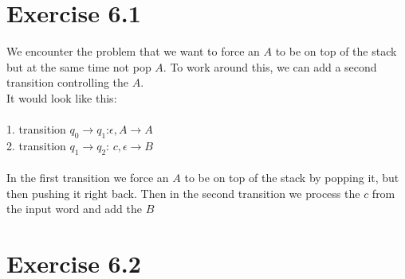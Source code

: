 \documentclass{article} %
\newcommand{\homeworkNumber}{6}
\begin{document}
\section*{Exercise \homeworkNumber.1}
We encounter the problem that we want to force an $A$ to be on top of the stack but at the same time not pop $A$.
To work around this, we can add a second transition controlling the $A$.\\
It would look like this:\\\\
1. transition $q_0 \to q_1$:\quad $\epsilon, A \to A$\\
2. transition $q_1 \to q_2$: \quad $c, \epsilon \to B$\\\\
In the first transition we force an $A$ to be on top of the stack by popping it, but then pushing it right back. Then in the second transition we process the $c$ from the input word and add the $B$


\section*{Exercise \homeworkNumber.2}
\end{document}

